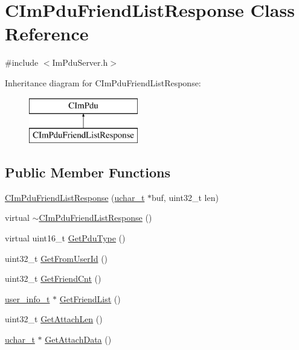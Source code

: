 \hypertarget{class_c_im_pdu_friend_list_response}{}\section{C\+Im\+Pdu\+Friend\+List\+Response Class Reference}
\label{class_c_im_pdu_friend_list_response}


{\ttfamily \#include $<$Im\+Pdu\+Server.\+h$>$}

Inheritance diagram for C\+Im\+Pdu\+Friend\+List\+Response\+:\begin{figure}[H]
\begin{center}
\leavevmode
\includegraphics[height=2.000000cm]{class_c_im_pdu_friend_list_response}
\end{center}
\end{figure}
\subsection*{Public Member Functions}
\begin{DoxyCompactItemize}
\item 
\hyperlink{class_c_im_pdu_friend_list_response_adbb0c0ef8991384733395d477d4de786}{C\+Im\+Pdu\+Friend\+List\+Response} (\hyperlink{base_2ostype_8h_a124ea0f8f4a23a0a286b5582137f0b8d}{uchar\+\_\+t} $\ast$buf, uint32\+\_\+t len)
\item 
virtual \hyperlink{class_c_im_pdu_friend_list_response_a47147e96d79f4828298948bb8d3237ce}{$\sim$\+C\+Im\+Pdu\+Friend\+List\+Response} ()
\item 
virtual uint16\+\_\+t \hyperlink{class_c_im_pdu_friend_list_response_addb37d40d9abb822aa4335eba470dd6a}{Get\+Pdu\+Type} ()
\item 
uint32\+\_\+t \hyperlink{class_c_im_pdu_friend_list_response_a1d546cdfbdf7fc8d928ccf3881a5f12a}{Get\+From\+User\+Id} ()
\item 
uint32\+\_\+t \hyperlink{class_c_im_pdu_friend_list_response_a9001d097faee144ea38e69b67e2fe58c}{Get\+Friend\+Cnt} ()
\item 
\hyperlink{structuser__info__t}{user\+\_\+info\+\_\+t} $\ast$ \hyperlink{class_c_im_pdu_friend_list_response_ad25a8a9713031d4694a681f3e529c078}{Get\+Friend\+List} ()
\item 
uint32\+\_\+t \hyperlink{class_c_im_pdu_friend_list_response_a8f99d01979be36d0d3c76b7b096ea397}{Get\+Attach\+Len} ()
\item 
\hyperlink{base_2ostype_8h_a124ea0f8f4a23a0a286b5582137f0b8d}{uchar\+\_\+t} $\ast$ \hyperlink{class_c_im_pdu_friend_list_response_a7c520a2ebccdc0f606cdf4ba1e798183}{Get\+Attach\+Data} ()
\end{DoxyCompactItemize}
